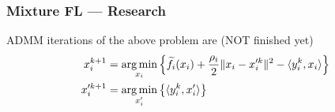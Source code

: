 \begin{frame}
\frametitle{Mixture FL --- Research}

ADMM iterations of the above problem are (NOT finished yet)
\begin{align*}
    x_i^{k+1} & = \argmin_{x_i} \left\{ \widetilde{f}_i(x_i) + \frac{\rho_i}{2} \lVert x_i-x_i'^k \rVert^2 - \langle y_i^k, x_i \rangle \right\} \\
    x_i'^{k+1} & = \argmin_{x_i'} \left\{ \langle y_i^k, x_i' \rangle \right\} \\ %
\end{align*}

\end{frame}


























